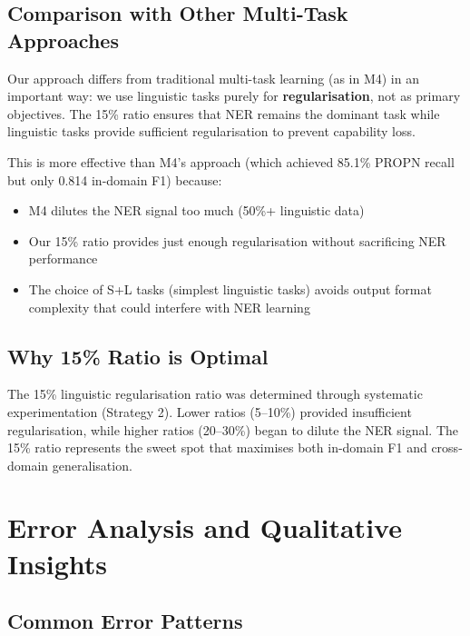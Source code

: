 \subsection{Comparison with Other Multi-Task Approaches}

Our approach differs from traditional multi-task learning \cite{ruder2017overview} (as in M4) in an important way: we use linguistic tasks purely for \textbf{regularisation}, not as primary objectives. The 15\% ratio ensures that NER remains the dominant task while linguistic tasks provide sufficient regularisation to prevent capability loss.

This is more effective than M4's approach (which achieved 85.1\% PROPN recall but only 0.814 in-domain F1) because:
\begin{itemize}
    \item M4 dilutes the NER signal too much (50\%+ linguistic data)
    \item Our 15\% ratio provides just enough regularisation without sacrificing NER performance
    \item The choice of S+L tasks (simplest linguistic tasks) avoids output format complexity that could interfere with NER learning
\end{itemize}

\subsection{Why 15\% Ratio is Optimal}

The 15\% linguistic regularisation ratio was determined through systematic experimentation (Strategy 2). Lower ratios (5–10\%) provided insufficient regularisation, while higher ratios (20–30\%) began to dilute the NER signal. The 15\% ratio represents the sweet spot that maximises both in-domain F1 and cross-domain generalisation.

\section{Error Analysis and Qualitative Insights}

\subsection{Common Error Patterns}

